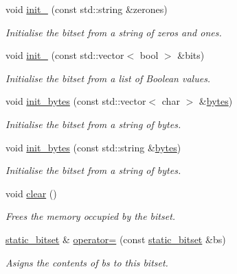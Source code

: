 \begin{DoxyCompactItemize}
void \hyperlink{classlgraph_1_1utils_1_1static__bitset_ab94cca3ec07c19d17a205eb486fc6cdd}{init\+\_} (const std\+::string \&zerones)
\begin{DoxyCompactList}\small\item\em Initialise the bitset from a string of zeros and ones. \end{DoxyCompactList}\item 
void \hyperlink{classlgraph_1_1utils_1_1static__bitset_a223b698841c841d517155f5cdcc1c9a4}{init\+\_} (const std\+::vector$<$ bool $>$ \&bits)
\begin{DoxyCompactList}\small\item\em Initialise the bitset from a list of Boolean values. \end{DoxyCompactList}\item 
void \hyperlink{classlgraph_1_1utils_1_1static__bitset_a00b39bf2552cbab68a9d5ee7f430e59d}{init\+\_\+bytes} (const std\+::vector$<$ char $>$ \&\hyperlink{classlgraph_1_1utils_1_1static__bitset_a56d277fc22bbf71a27fca530a133c9bd}{bytes})
\begin{DoxyCompactList}\small\item\em Initialise the bitset from a string of bytes. \end{DoxyCompactList}\item 
void \hyperlink{classlgraph_1_1utils_1_1static__bitset_a8fe9cefb9a05d30b1586810c6ccda923}{init\+\_\+bytes} (const std\+::string \&\hyperlink{classlgraph_1_1utils_1_1static__bitset_a56d277fc22bbf71a27fca530a133c9bd}{bytes})
\begin{DoxyCompactList}\small\item\em Initialise the bitset from a string of bytes. \end{DoxyCompactList}\item 
void \hyperlink{classlgraph_1_1utils_1_1static__bitset_a6013f8230ae37554328dfe0884d89c71}{clear} ()
\begin{DoxyCompactList}\small\item\em Frees the memory occupied by the bitset. \end{DoxyCompactList}\item 
\hyperlink{classlgraph_1_1utils_1_1static__bitset}{static\+\_\+bitset} \& \hyperlink{classlgraph_1_1utils_1_1static__bitset_a3215c8066fffcd8eed871914d42c40b8}{operator=} (const \hyperlink{classlgraph_1_1utils_1_1static__bitset}{static\+\_\+bitset} \&bs)
\begin{DoxyCompactList}\small\item\em Asigns the contents of {\itshape bs} to this bitset. \end{DoxyCompactList}\item 

\end{DoxyCompactItemize}
